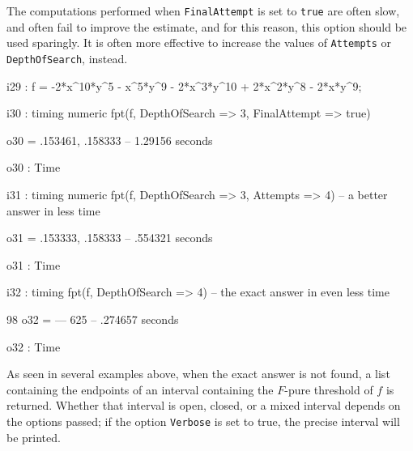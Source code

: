 \documentclass{amsart}
\begin{document}
The computations performed when {\tt FinalAttempt} is set to {\tt true} are often slow, and often fail to improve the estimate, and for this reason, this option should be used sparingly. It is often more effective to increase the values of {\tt Attempts} or {\tt DepthOfSearch}, instead.

\medspace
{\small
{}
\begin{MyVerbatim}

i29 : f = -2*x^10*y^5 - x^5*y^9 - 2*x^3*y^10 + 2*x^2*y^8 - 2*x*y^9;

i30 : timing numeric fpt(f, DepthOfSearch => 3, FinalAttempt => true)

o30 = {.153461, .158333}
      -- 1.29156 seconds

o30 : Time

i31 : timing numeric fpt(f, DepthOfSearch => 3, Attempts => 4) -- a better
      answer in less time

o31 = {.153333, .158333}
      -- .554321 seconds

o31 : Time

i32 : timing fpt(f, DepthOfSearch => 4) -- the exact answer in even less
      time

       98
o32 = ---
      625
      -- .274657 seconds

o32 : Time
\end{MyVerbatim}
}
\medspace


As seen in several examples above, when the exact answer is not found, a list containing the endpoints of an interval containing the $F$-pure threshold of $f$ is returned. Whether that interval is open, closed, or a mixed interval depends on the options passed; if the option {\tt Verbose} is set to true, the precise interval will be printed.
\end{document}
